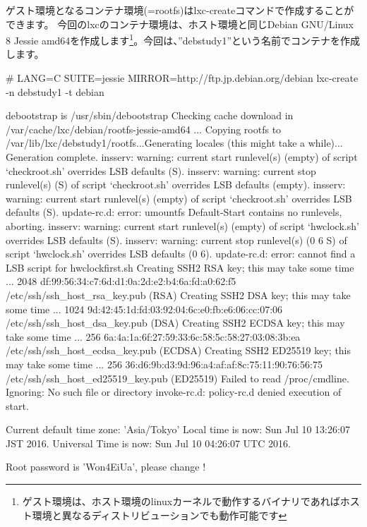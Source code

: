 \documentclass[mingoth,a4paper]{jsarticle}
\begin{document}
ゲスト環境となるコンテナ環境(=rootfs)はlxc-createコマンドで作成することができます。
今回のlxcのコンテナ環境は、ホスト環境と同じDebian GNU/Linux 8 Jessie amd64を作成します\footnote{ゲスト環境は、ホスト環境のlinuxカーネルで動作するバイナリであればホスト環境と異なるディストリビューションでも動作可能です}。今回は、''debstudy1''という名前でコンテナを作成します。

\begin{commandline}
  # LANG=C SUITE=jessie MIRROR=http://ftp.jp.debian.org/debian lxc-create -n debstudy1 -t debian

  debootstrap is /usr/sbin/debootstrap
  Checking cache download in /var/cache/lxc/debian/rootfs-jessie-amd64 ...
  Copying rootfs to /var/lib/lxc/debstudy1/rootfs...Generating locales (this might take a while)...
  Generation complete.
  insserv: warning: current start runlevel(s) (empty) of script `checkroot.sh' overrides LSB defaults (S).
  insserv: warning: current stop runlevel(s) (S) of script `checkroot.sh' overrides LSB defaults (empty).
  insserv: warning: current start runlevel(s) (empty) of script `checkroot.sh' overrides LSB defaults (S).
  update-rc.d: error: umountfs Default-Start contains no runlevels, aborting.
  insserv: warning: current start runlevel(s) (empty) of script `hwclock.sh' overrides LSB defaults (S).
  insserv: warning: current stop runlevel(s) (0 6 S) of script `hwclock.sh' overrides LSB defaults (0 6).
  update-rc.d: error: cannot find a LSB script for hwclockfirst.sh
  Creating SSH2 RSA key; this may take some time ...
  2048 df:99:56:34:c7:6d:d1:0a:2d:e2:b4:6a:fd:a0:62:f5 /etc/ssh/ssh_host_rsa_key.pub (RSA)
  Creating SSH2 DSA key; this may take some time ...
  1024 9d:42:45:1d:fd:03:92:04:6c:e0:fb:e6:06:cc:07:06 /etc/ssh/ssh_host_dsa_key.pub (DSA)
  Creating SSH2 ECDSA key; this may take some time ...
  256 6a:4a:1a:6f:27:59:33:6c:58:5c:58:27:03:08:3b:ea /etc/ssh/ssh_host_ecdsa_key.pub (ECDSA)
  Creating SSH2 ED25519 key; this may take some time ...
  256 36:d6:9b:d3:9d:96:a4:af:af:8c:75:11:90:76:56:75 /etc/ssh/ssh_host_ed25519_key.pub (ED25519)
  Failed to read /proc/cmdline. Ignoring: No such file or directory
  invoke-rc.d: policy-rc.d denied execution of start.

  Current default time zone: 'Asia/Tokyo'
  Local time is now:      Sun Jul 10 13:26:07 JST 2016.
  Universal Time is now:  Sun Jul 10 04:26:07 UTC 2016.

  Root password is 'Won4EiUa', please change !
\end{commandline}
\end{document}
